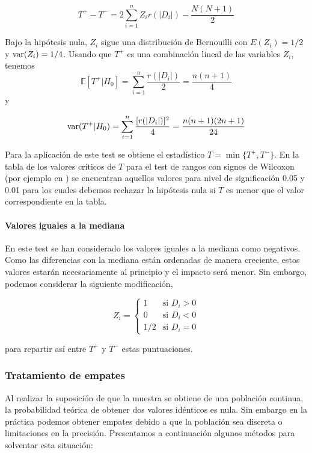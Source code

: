 	\[ T^+  - T^- = 2 \sum\limits_{i=1}^n
					 Z_i r(|D_i|) - \frac{N(N+1)}{2} \]
	
	Bajo la hipótesis nula, $Z_i$ sigue una distribución de 
Bernouilli con $E(Z_i) = 1/2$ y $\text{var}(Z_i) = 1/4$. Usando que 
$T^+$ es una combinación lineal de las variables $Z_i$, 
tenemos
	\[ \mathbb{E}[ T^+ | H_0 ] = \sum\limits_{i=1}^n 
						\frac{r(|D_i|)}{2} 
					= \frac{n(n+1)}{4}			\]
	y
	
	\[ \text{var}( T^+ | H_0 ) = \sum\limits_{i=1}^n 
						\frac{[r(|D_i|)]^2}{4} 
					= \frac{n(n+1)(2n+1)}{24}	\]
					
	Para la aplicación de este test se obtiene el estadístico 
$T = \min \{ T^+, T^- \}$. En la tabla de los valores 
críticos de $T$ para el test de rangos con signos de Wilcoxon 
(por ejemplo en \cite[Tabla A5]{sheskin2003handbook}) se encuentran aquellos valores 
para nivel de significación 0.05 y 0.01 para los cuales 
debemos rechazar la hipótesis nula si $T$ es menor que el 
valor correspondiente en la tabla.\\
	
\paragraph{Valores iguales a la mediana} En este test se han 
considerado los valores iguales a la mediana como negativos. 
Como las diferencias con la mediana están ordenadas de manera 
creciente, estos valores estarán necesariamente al principio 
y el impacto será menor. Sin embargo, podemos considerar la 
siguiente modificación,

	\[ Z_i = \left\lbrace \begin{array}{ll}
	 				1 & \text{si } D_i > 0 \\
	 				0 & \text{si } D_i < 0 \\
	 				1/2 & \text{si } D_i = 0 
	 		\end{array} \right. 					\]
	
	para repartir así entre $T^+$ y $T^-$ estas puntuaciones. 
	
\subsubsection{Tratamiento de empates}
	
	Al realizar la suposición de que la muestra se obtiene de 
una población continua, la probabilidad teórica de obtener 
dos valores idénticos es nula. Sin embargo en la práctica 
podemos obtener empates debido a que la población sea 
discreta o limitaciones en la precisión. Presentamos a 
continuación algunos métodos para solventar esta situación:
	
